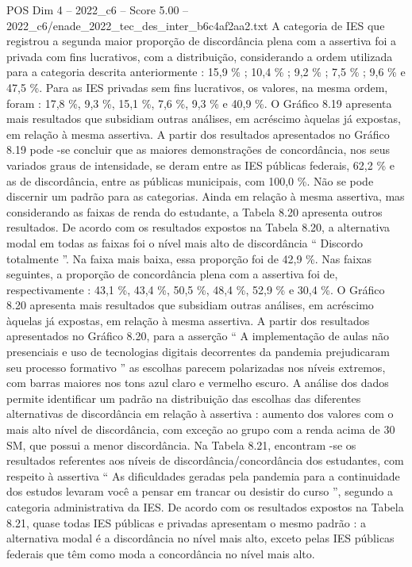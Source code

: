 \begin{textsample}{POS Dim 4 – 2022\_c6 – Score 5.00 – 2022\_c6/enade\_2022\_tec\_des\_inter\_b6c4af2aa2.txt}
A categoria de IES que registrou a segunda maior proporção de discordância plena com a assertiva foi a privada com fins lucrativos, com a distribuição, considerando a ordem utilizada para a categoria descrita anteriormente : 15,9 \% ; 10,4 \% ; 9,2 \% ; 7,5 \% ; 9,6 \% e 47,5 \%.
Para as IES privadas sem fins lucrativos, os valores, na mesma ordem, foram : 17,8 \%, 9,3 \%, 15,1 \%, 7,6 \%, 9,3 \% e 40,9 \%.
O Gráfico 8.19 apresenta mais resultados que subsidiam outras análises, em acréscimo àquelas já expostas, em relação à mesma assertiva.
A partir dos resultados apresentados no Gráfico 8.19 pode -se concluir que as maiores demonstrações de concordância, nos seus variados graus de intensidade, se deram entre as IES públicas federais, 62,2 \% e as de discordância, entre as públicas municipais, com 100,0 \%.
Não se pode discernir um padrão para as categorias.
Ainda em relação à mesma assertiva, mas considerando as faixas de renda do estudante, a Tabela 8.20 apresenta outros resultados.
De acordo com os resultados expostos na Tabela 8.20, a alternativa modal em todas as faixas foi o nível mais alto de discordância “ Discordo totalmente ”.
Na faixa mais baixa, essa proporção foi de 42,9 \%.
Nas faixas seguintes, a proporção de concordância plena com a assertiva foi de, respectivamente : 43,1 \%, 43,4 \%, 50,5 \%, 48,4 \%, 52,9 \% e 30,4 \%.
O Gráfico 8.20 apresenta mais resultados que subsidiam outras análises, em acréscimo àquelas já expostas, em relação à mesma assertiva.
A partir dos resultados apresentados no Gráfico 8.20, para a asserção “ A implementação de aulas não presenciais e uso de tecnologias digitais decorrentes da pandemia prejudicaram seu processo formativo ” as escolhas parecem polarizadas nos níveis extremos, com barras maiores nos tons azul claro e vermelho escuro.
A análise dos dados permite identificar um padrão na distribuição das escolhas das diferentes alternativas de discordância em relação à assertiva : aumento dos valores com o mais alto nível de discordância, com exceção ao grupo com a renda acima de 30 SM, que possui a menor discordância.
Na Tabela 8.21, encontram -se os resultados referentes aos níveis de discordância/concordância dos estudantes, com respeito à assertiva “ As dificuldades geradas pela pandemia para a continuidade dos estudos levaram você a pensar em trancar ou desistir do curso ”, segundo a categoria administrativa da IES.
De acordo com os resultados expostos na Tabela 8.21, quase todas IES públicas e privadas apresentam o mesmo padrão : a alternativa modal é a discordância no nível mais alto, exceto pelas IES públicas federais que têm como moda a concordância no nível mais alto.

\end{textsample}
